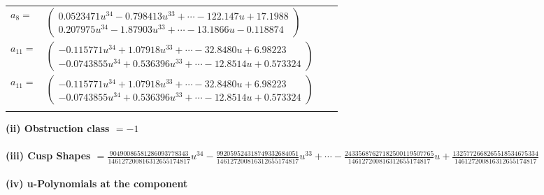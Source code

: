 \documentclass[1p]{elsarticle_modified}
\theoremstyle{definition}
\begin{document}
\begin{tabular}{m{7pt} m{180pt} m{7pt} m{180pt} }
\flushright $a_{8}=$&$\begin{pmatrix}0.0523471 u^{34}-0.798413 u^{33}+\cdots-122.147 u+17.1988\\0.207975 u^{34}-1.87903 u^{33}+\cdots-13.1866 u-0.118874\end{pmatrix}$ \\
\flushright $a_{11}=$&$\begin{pmatrix}-0.115771 u^{34}+1.07918 u^{33}+\cdots-32.8480 u+6.98223\\-0.0743855 u^{34}+0.536396 u^{33}+\cdots-12.8514 u+0.573324\end{pmatrix}$\\ \flushright $a_{11}=$&$\begin{pmatrix}-0.115771 u^{34}+1.07918 u^{33}+\cdots-32.8480 u+6.98223\\-0.0743855 u^{34}+0.536396 u^{33}+\cdots-12.8514 u+0.573324\end{pmatrix}$\\&\end{tabular}
\flushleft \textbf{(ii) Obstruction class $= -1$}\\~\\
\flushleft \textbf{(iii) Cusp Shapes $= \frac{90490086581286093778343}{146127200816312655174817} u^{34}-\frac{992059524318749332684051}{146127200816312655174817} u^{33}+\cdots-\frac{24335687627182500119507765}{146127200816312655174817} u+\frac{1325772668265518534675334}{146127200816312655174817}$}\\~\\
\newpage\renewcommand{\arraystretch}{1}
\flushleft \textbf{(iv) u-Polynomials at the component}\newline \\
\end{document}
